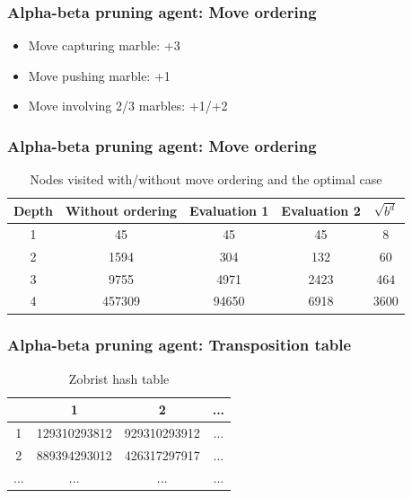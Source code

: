 \documentclass{beamer}
\begin{document}
\begin{frame}
	\frametitle{Alpha-beta pruning agent: Move ordering}
	\begin{itemize}
		\item Move capturing marble: +3
		\item Move pushing marble: +1
		\item Move involving 2/3 marbles: +1/+2
	\end{itemize}
\end{frame}
\begin{frame}
	\frametitle{Alpha-beta pruning agent: Move ordering}
	\begin{table}
		\begin{center}
			\begin{tabular}{ | c | c | c | c | c | }
				\hline
				Depth & Without ordering & Evaluation 1 & Evaluation 2 & $\sqrt{b^d}$ \\
				\hline
				1     & 45               & 45           & 45           & 8            \\
				\hline
				2     & 1594             & 304          & 132          & 60           \\
				\hline
				3     & 9755             & 4971         & 2423         & 464          \\
				\hline
				4     & 457309           & 94650        & 6918         & 3600         \\
				\hline
			\end{tabular}
		\end{center}
		\caption{Nodes visited with/without move ordering and the optimal case}
		\label{node_count}
	\end{table}

\end{frame}

\begin{frame}
	\frametitle{Alpha-beta pruning agent: Transposition table}
	\begin{table}
		\begin{center}
			\begin{tabular}{ | c | c | c | c | }
				\hline
				    & 1            & 2            & ... \\
				\hline
				1   & 129310293812 & 929310293912 & ... \\
				\hline
				2   & 889394293012 & 426317297917 & ... \\
				\hline
				... & ...          & ...          & ... \\
				\hline
			\end{tabular}
		\end{center}
		\caption{Zobrist hash table}
		\label{heuristic_table}
	\end{table}

\end{frame}
\end{document}

